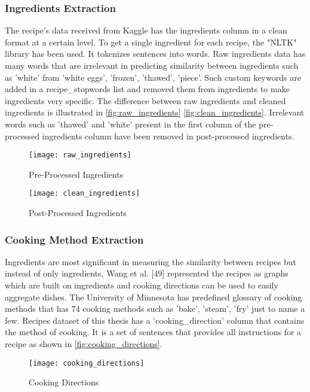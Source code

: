\subsubsection{Ingredients Extraction}
The recipe's data received from Kaggle has the ingredients column in a clean format at a certain level. To get a single ingredient for each recipe, the "NLTK" library has been used. It tokenizes sentences into words. Raw ingredients data has many words that are irrelevant in predicting similarity between ingredients such as 'white' from 'white eggs', 'frozen', 'thawed', 'piece'. Such custom keywords are added in a recipe\_stopwords list and removed them from ingredients to make ingredients very specific. The difference between raw ingredients and cleaned ingredients is illustrated in \autoref{fig:raw_ingredients} \autoref{fig:clean_ingredients}. Irrelevant words such as 'thawed' and 'white' present in the first column of the pre-processed ingredients column have been removed in post-processed ingredients.

\begin{figure}[H]
	\centering
	\texttt{[image: raw\_ingredients]}
	\caption{Pre-Processed Ingredients }
	\label{fig:raw_ingredients}
\end{figure}  


\begin{figure}[H]
	\centering
	\texttt{[image: clean\_ingredients]}
	\caption{Post-Processed Ingredients }
	\label{fig:clean_ingredients}
\end{figure}  

\subsubsection{Cooking Method Extraction}
Ingredients are most significant in measuring the similarity between recipes but instead of only ingredients, Wang et al. [49] represented the recipes as graphs which are built on ingredients and cooking directions can be used to easily aggregate dishes. 
The University of Minnesota has predefined glossary of cooking methods \cite{50} that has $74$ cooking methods such as 'bake', 'steam', 'fry' just to name a few. Recipes dataset of this thesis has a 'cooking\_direction' column that contains the method of cooking. It is a set of sentences that provides all instructions for a recipe as shown in \autoref{fig:cooking_directions}.
\begin{figure}[H]
	\centering
	\texttt{[image: cooking\_directions]}
	\caption{Cooking Directions }
	\label{fig:cooking_directions}
\end{figure}  

